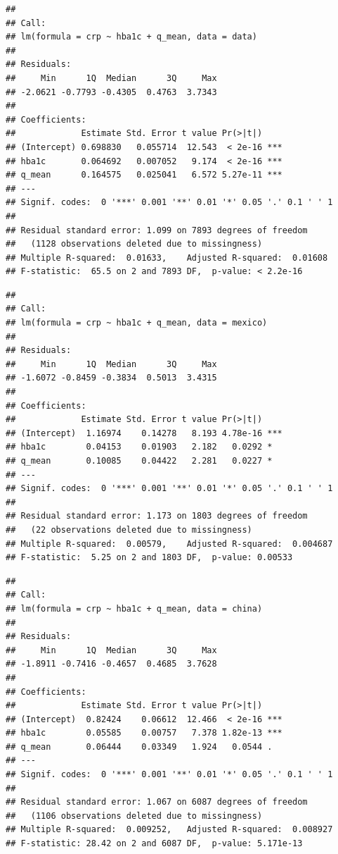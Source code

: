 \documentclass[
  man,floatsintext]{apa6}
\begin{document}
\begin{verbatim}
## 
## Call:
## lm(formula = crp ~ hba1c + q_mean, data = data)
## 
## Residuals:
##     Min      1Q  Median      3Q     Max 
## -2.0621 -0.7793 -0.4305  0.4763  3.7343 
## 
## Coefficients:
##             Estimate Std. Error t value Pr(>|t|)    
## (Intercept) 0.698830   0.055714  12.543  < 2e-16 ***
## hba1c       0.064692   0.007052   9.174  < 2e-16 ***
## q_mean      0.164575   0.025041   6.572 5.27e-11 ***
## ---
## Signif. codes:  0 '***' 0.001 '**' 0.01 '*' 0.05 '.' 0.1 ' ' 1
## 
## Residual standard error: 1.099 on 7893 degrees of freedom
##   (1128 observations deleted due to missingness)
## Multiple R-squared:  0.01633,    Adjusted R-squared:  0.01608 
## F-statistic:  65.5 on 2 and 7893 DF,  p-value: < 2.2e-16
\end{verbatim}

\begin{verbatim}
## 
## Call:
## lm(formula = crp ~ hba1c + q_mean, data = mexico)
## 
## Residuals:
##     Min      1Q  Median      3Q     Max 
## -1.6072 -0.8459 -0.3834  0.5013  3.4315 
## 
## Coefficients:
##             Estimate Std. Error t value Pr(>|t|)    
## (Intercept)  1.16974    0.14278   8.193 4.78e-16 ***
## hba1c        0.04153    0.01903   2.182   0.0292 *  
## q_mean       0.10085    0.04422   2.281   0.0227 *  
## ---
## Signif. codes:  0 '***' 0.001 '**' 0.01 '*' 0.05 '.' 0.1 ' ' 1
## 
## Residual standard error: 1.173 on 1803 degrees of freedom
##   (22 observations deleted due to missingness)
## Multiple R-squared:  0.00579,    Adjusted R-squared:  0.004687 
## F-statistic:  5.25 on 2 and 1803 DF,  p-value: 0.00533
\end{verbatim}

\begin{verbatim}
## 
## Call:
## lm(formula = crp ~ hba1c + q_mean, data = china)
## 
## Residuals:
##     Min      1Q  Median      3Q     Max 
## -1.8911 -0.7416 -0.4657  0.4685  3.7628 
## 
## Coefficients:
##             Estimate Std. Error t value Pr(>|t|)    
## (Intercept)  0.82424    0.06612  12.466  < 2e-16 ***
## hba1c        0.05585    0.00757   7.378 1.82e-13 ***
## q_mean       0.06444    0.03349   1.924   0.0544 .  
## ---
## Signif. codes:  0 '***' 0.001 '**' 0.01 '*' 0.05 '.' 0.1 ' ' 1
## 
## Residual standard error: 1.067 on 6087 degrees of freedom
##   (1106 observations deleted due to missingness)
## Multiple R-squared:  0.009252,   Adjusted R-squared:  0.008927 
## F-statistic: 28.42 on 2 and 6087 DF,  p-value: 5.171e-13
\end{verbatim}
\end{document}
